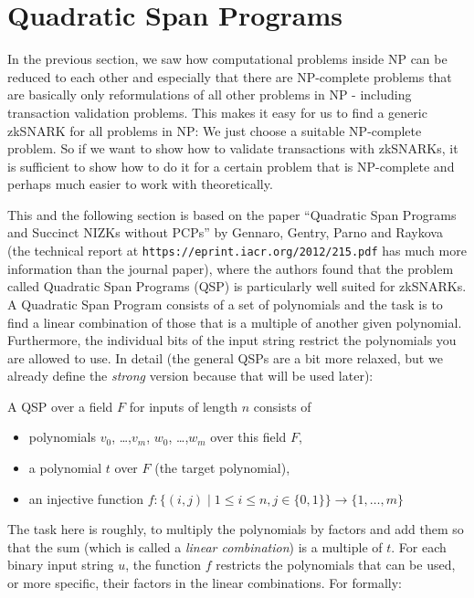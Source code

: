\documentclass[11pt,letterpaper]{article}
\begin{document}
\section{Quadratic Span Programs}


In the previous section, we saw how computational problems inside NP can be reduced to each other and especially that there are NP-complete problems that are basically only reformulations of all other problems in NP - including transaction validation problems. This makes it easy for us to find a generic zkSNARK for all problems in NP: We just choose a suitable NP-complete problem. So if we want to show how to validate transactions with zkSNARKs, it is sufficient to show how to do it for a certain problem that is NP-complete and perhaps much easier to work with theoretically.


This and the following section is based on the paper ``Quadratic Span Programs and Succinct NIZKs without PCPs'' by Gennaro, Gentry, Parno and Raykova (the technical report at \texttt{https://eprint.iacr.org/2012/215.pdf} has much more information than the journal paper), where the authors found that the problem called Quadratic Span Programs (QSP) is particularly well suited for zkSNARKs. A Quadratic Span Program consists of a set of polynomials and the task is to find a linear combination of those that is a multiple of another given polynomial. Furthermore, the individual bits of the input string restrict the polynomials you are allowed to use. In detail (the general QSPs are a bit more relaxed, but we already define the \textit{strong} version because that will be used later):


A QSP over a field $F$ for inputs of length $n$ consists of
\begin{itemize}
\item polynomials $v_{0}$, \dots,$v_{m}$, $w_{0}$, \dots,$w_{m}$ over this field $F$,
\item a polynomial $t$ over $F$ (the target polynomial),
\item an injective function $f\colon \{(i, j) \mid 1 \le  i \le  n, j \in  \{0, 1\}\} \rightarrow \{1,  \dots, m\}$
\end{itemize}


The task here is roughly, to multiply the polynomials by factors and add them so that the sum (which is called a \textit{linear combination}) is a multiple of $t$. For each binary input string $u$, the function $f$ restricts the polynomials that can be used, or more specific, their factors in the linear combinations. For formally:
\end{document}

